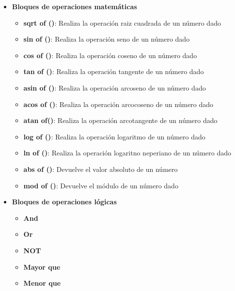 \begin{itemize}
\item \textbf{Bloques de operaciones matemáticas}
	\begin{itemize}

    \item \textbf{sqrt of ()}: Realiza la operación raiz cuadrada de un número dado
    \item \textbf{sin of ()}: Realiza la operación seno de un número dado
    \item \textbf{cos of ()}: Realiza la operación coseno de un número dado
    \item \textbf{tan of ()}: Realiza la operación tangente de un número dado
    \item \textbf{asin of ()}: Realiza la operación arcoseno de un número dado
    \item \textbf{acos of ()}: Realiza la operación arcocoseno de un número dado
    \item \textbf{atan of()}: Realiza la operación arcotangente de un número dado
    \item \textbf{log of ()}: Realiza la operación logaritmo de un número dado
    \item \textbf{ln of ()}: Realiza la operación logaritno neperiano de un número dado
    \item \textbf{abs of ()}: Devuelve el valor absoluto de un número
    \item \textbf{mod of ()}: Devuelve el módulo de un número dado
    \end{itemize}

\item \textbf{Bloques de operaciones lógicas}
\begin{itemize}

 \item \textbf{And}
 \item \textbf{Or}
 \item \textbf{NOT}
 \item \textbf{Mayor que}
 \item \textbf{Menor que}

\end{itemize}


\end{itemize}
